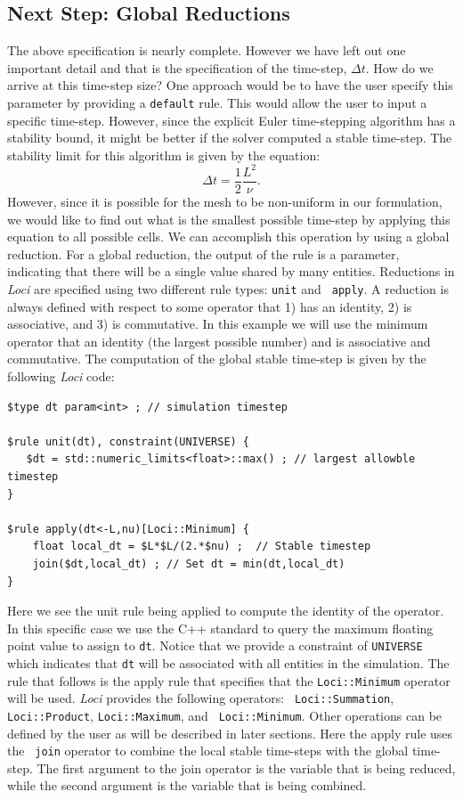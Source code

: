 \documentclass[10pt,epsf,letterpaper,twoside]{book}
\begin{document}
\subsection{Next Step: Global Reductions}

The above specification is nearly complete.  However we have left out
one important detail and that is the specification of the time-step,
$\Delta t$.  How do we arrive at this time-step size?  One approach
would be to have the user specify this parameter by providing a
{\tt default} rule.  This would allow the user to input a specific
time-step.  However, since the explicit Euler time-stepping algorithm
has a stability bound, it might be better if the solver computed a
stable time-step.  The stability limit for this algorithm is given by
the equation:
\begin{equation}
\Delta t = \frac{1}{2}\frac{L^2}{\nu}.
\end{equation}
However, since it is possible for the mesh to be non-uniform in our
formulation, we would like to find out what is the smallest possible
time-step by applying this equation to all possible cells.  We can
accomplish this operation by using a global reduction.  For a global
reduction, the output of the rule is a parameter, indicating that
there will be a single value shared by many entities.  Reductions in
{\it Loci} are specified using two different rule types: {\tt unit} and {\tt
  apply}.  A reduction is always defined with respect to some operator
that 1) has an identity, 2) is associative, and 3) is commutative.
In this example we will use the minimum operator that an identity (the
largest possible number) and is associative and commutative.  The
computation of the global stable time-step is given by the following
{\it Loci} code:
\begin{verbatim}
$type dt param<int> ; // simulation timestep

$rule unit(dt), constraint(UNIVERSE) {
   $dt = std::numeric_limits<float>::max() ; // largest allowble timestep
}

$rule apply(dt<-L,nu)[Loci::Minimum] {
    float local_dt = $L*$L/(2.*$nu) ;  // Stable timestep
    join($dt,local_dt) ; // Set dt = min(dt,local_dt)
}
\end{verbatim}

Here we see the unit rule being applied to compute the identity of the
operator.  In this specific case we use the C++ standard to query the
maximum floating point value to assign to {\tt dt}. Notice that we
provide a constraint of {\tt UNIVERSE} which indicates that {\tt dt}
will be associated with all entities in the simulation.  The rule that
follows is the apply rule that specifies that the {\tt Loci::Minimum}
operator will be used.  {\it Loci} provides the following operators: {\tt
  Loci::Summation}, {\tt Loci::Product}, {\tt Loci::Maximum}, and {\tt
  Loci::Minimum}.  Other operations can be defined by the user as will
be described in later sections.  Here the apply rule uses the {\tt
  join} operator to combine the local stable time-steps with the
global time-step.  The first argument to the join operator is the
variable that is being reduced, while the second argument is the
variable that is being combined.  
\end{document}
